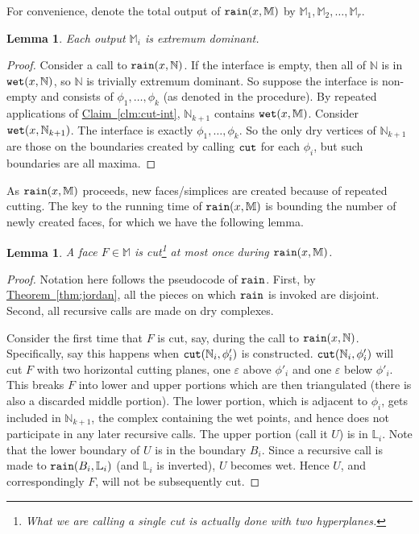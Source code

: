 \documentclass[11pt]{article}
\newtheorem{lemma}[theorem]{Lemma}
\theoremstyle{definition}
\newcommand{\LL}{\mathbb{L}}
\newcommand{\MM}{\mathbb{M}}
\newcommand{\NN}{\mathbb{N}}
\newcommand{\eps}{\varepsilon}
\newcommand{\Clm}[1]{\hyperref[clm:#1]{Claim~\ref*{clm:#1}}} %
\newcommand{\Thm}[1]{\hyperref[thm:#1]{Theorem~\ref*{thm:#1}}} %
\newcommand{\cut}{{\tt cut}}
\newcommand{\rain}{{\tt rain}}
\newcommand{\wet}{{\tt wet}}
\begin{document}
\medskip
For convenience, denote the total output of $\rain(x,\MM)$ by $\MM_1, \MM_2, \ldots, \MM_r$.

\begin{lemma} \label{lem:rain-1} Each output $\MM_i$ is extremum dominant.
\end{lemma}

\begin{proof} Consider a call to $\rain(x,\NN)$. If the interface is empty, then all of $\NN$
is in $\wet(x,\NN)$, so $\NN$ is trivially extremum dominant. So suppose the interface
is non-empty and consists of $\phi_1, \ldots, \phi_k$ (as denoted in the procedure).
By repeated applications of \Clm{cut-int}, $\NN_{k+1}$ contains $\wet(x,\MM)$. 
Consider $\wet(x,\NN_{k+1})$. The interface is exactly $\phi_1, \ldots, \phi_k$.
So the only dry vertices of $\NN_{k+1}$ are those on the boundaries created by calling $\cut$ for each $\phi_i$, 
but such boundaries are all maxima.
\end{proof}

As $\rain(x,\MM)$ proceeds, new faces/simplices are created because of repeated cutting. 
The key to the running time of $\rain(x,\MM)$ is bounding the number of newly created faces, for which we have the following lemma.

\begin{lemma}\label{lem:new-verts}
A face $F \in \MM$ is cut\footnote{What we are calling a single cut is actually done with two hyperplanes.} at most once during $\rain(x,\MM)$.
\end{lemma}
\begin{proof} Notation here follows the pseudocode of $\rain$.
First, by \Thm{jordan}, all the pieces on which $\rain$ is invoked are disjoint.
Second, all recursive calls are made on dry complexes.

Consider the first time that $F$ is cut, say, during the call to $\rain(x,\NN)$.
Specifically, say this happens when $\cut(\NN_i,\phi'_i)$ is constructed. 
$\cut(\NN_i,\phi'_i)$ will cut $F$ with two horizontal cutting planes, one $\eps$ above $\phi'_i$
and one $\eps$ below $\phi'_i$.  This breaks $F$ into lower and upper portions which are then triangulated
(there is also a discarded middle portion).  The lower portion, which is adjacent to $\phi_i$, gets included 
in $\NN_{k+1}$, the complex containing the wet points, and hence does not participate in any later recursive calls.  
The upper portion (call it $U$) is in $\LL_i$. Note that the lower
boundary of $U$ is in the boundary $B_i$. Since a recursive call is made to $\rain(B_i,\LL_i)$
(and $\LL_i$ is inverted), $U$ becomes wet. Hence $U$, and correspondingly $F$, will not be subsequently cut.
\end{proof}
\end{document}
